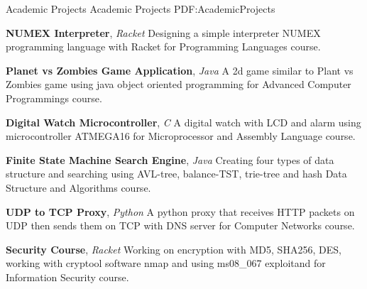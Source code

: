 \documentclass[letterpaper,MMMyyyy,nonstopmode]{resume}
\begin{document}
\begin{Body}

\newpage


\Section
{Academic Projects}
{Academic Projects}
{PDF:AcademicProjects}


\BulletItem
\textbf{NUMEX Interpreter},
\textit{\small{Racket}}
\hfill
{\normalsize{
\href{https://github.com/aliyazdi75/NUMEX-Interpreter}
{\faGithub}
}}
\Item
Designing a simple interpreter NUMEX programming language
with Racket for Programming Languages course.

\BigGap
\BulletItem
\textbf{Planet vs Zombies Game Application},
\textit{\small{Java}}
\hfill
{\normalsize{
\href{https://github.com/aliyazdi75/Planet\_vs\_Zombies}
{\faGithub}
}}
\Item
A 2d game similar to Plant vs Zombies game using java
object oriented programming for Advanced Computer Programmings course.

\BigGap
\BulletItem
\textbf{Digital Watch Microcontroller},
\textit{\small{C}}
\hfill
{\normalsize{
\href{https://github.com/aliyazdi75/Digital-Watch-with-LCD}
{\faGithub}
}}
\Item
A digital watch with LCD and alarm using microcontroller
ATMEGA16 for Microprocessor and Assembly Language course.



\BigGap
\BulletItem
\textbf{Finite State Machine Search Engine},
\textit{\small{Java}}
\hfill
{\normalsize{
\href{https://github.com/aliyazdi75/Finite-State-Machine}
{\faGithub}
}}
\Item
Creating four types of data structure and searching using
AVL-tree, balance-TST, trie-tree and hash Data Structure and Algorithms course.

\BigGap
\BulletItem
\textbf{UDP to TCP Proxy},
\textit{\small{Python}}
\hfill
{\normalsize{
\href{https://github.com/aliyazdi75/DNS-UDP-TCP-Proxy}
{\faGithub}
}}
\Item
A python proxy that receives HTTP packets on UDP
then sends them on TCP with DNS server for Computer Networks course.

\BigGap
\BulletItem
\textbf{Security Course},
\textit{\small{Racket}}
\hfill
{\normalsize{
\href{https://github.com/aliyazdi75/My-Security-Course}
{\faGithub}
}}
\Item
Working on encryption with MD5, SHA256, DES,
working with cryptool software nmap
and using ms08\_067 exploitand for Information Security course.


\end{Body}
\end{document}
